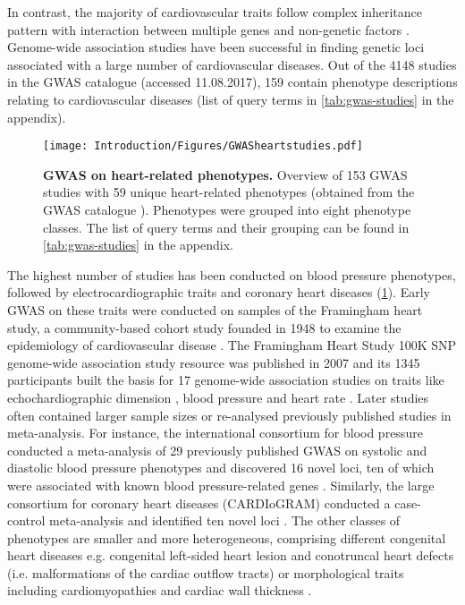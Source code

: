 In contrast, the majority of cardiovascular traits follow complex inheritance pattern with interaction between multiple genes and non-genetic factors \citep{Kathiresan2012}. Genome-wide association studies have been successful in finding genetic loci associated with a large number of cardiovascular diseases. Out of the \num{4148} studies in the GWAS catalogue (accessed 11.08.2017), \num{159} contain phenotype descriptions relating to cardiovascular diseases (list of query terms in \cref{tab:gwas-studies} in the appendix).
\\
\begin{figure}[hbtp]
	\centering
	\texttt{[image: Introduction/Figures/GWASheartstudies.pdf]}
	\caption[\textbf{GWAS on heart-related phenotypes. }]{\textbf{GWAS on heart-related phenotypes. } Overview of \num{153} GWAS studies with \num{59} unique heart-related phenotypes (obtained from the GWAS catalogue \citep[accessed on 11.08.2017]{MacArthur2017}). Phenotypes were grouped into eight phenotype classes. The list of query terms and their grouping can be found in \cref{tab:gwas-studies} in the appendix.} 
	 	\label{fig:gwas-heart}
\end{figure}

The highest number of studies has been conducted on blood pressure phenotypes, followed by electrocardiographic traits and coronary heart diseases (\cref{fig:gwas-heart}). Early GWAS on these traits were conducted on samples of the Framingham heart study, a community-based cohort study founded in 1948 to examine the epidemiology of cardiovascular disease \citep{Dawber1951,Kannel1979}. The Framingham Heart Study 100K SNP genome-wide association study resource was published in 2007 \citep{Cupples2007} and its \num{1345} participants built the basis for \num{17} genome-wide association studies on traits like echochardiographic dimension \citep{Vasan2007}, blood pressure \citep{Levy2007} and heart rate \citep{Newton-Cheh2007}. Later studies often contained larger sample sizes or re-analysed previously published studies in meta-analysis. For instance, the international consortium for blood pressure conducted a meta-analysis of \num{29} previously published GWAS on systolic and diastolic blood pressure phenotypes and discovered \num{16} novel loci, ten of which were associated with known blood pressure-related genes \citep{Ehret2011}. Similarly, the large consortium for coronary heart diseases  (CARDIoGRAM)  conducted a case-control meta-analysis  and identified ten novel loci  \citep{Nikpay2015}. The other classes of phenotypes are smaller and more heterogeneous, comprising different congenital heart diseases e.g. congenital left-sided heart lesion \citep{Mitchell2015,Hanchard2016} and conotruncal heart defects (i.e. malformations of the cardiac outflow tracts) \citep{Agopian2014} or morphological traits including cardiomyopathies \citep{ Villard2011} and cardiac wall thickness \citep{Vasan2009,Arnett2011}. 

